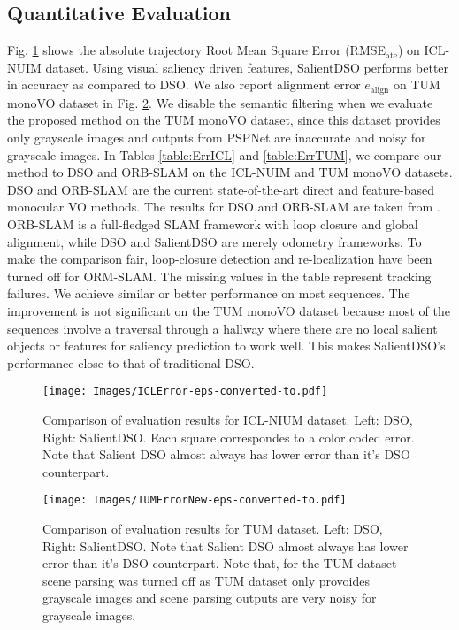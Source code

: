 \documentclass[letterpaper, 10 pt, conference]{ieeeconf}  %
\begin{document}
\subsection{Quantitative Evaluation}
Fig. \ref{fig:ICL_err} shows the absolute trajectory Root Mean Square Error (RMSE$_{\text{ate}}$) on ICL-NUIM dataset. Using visual saliency driven features, SalientDSO performs better in accuracy as compared to DSO. We also report alignment error $e_{\text{align}}$ on TUM monoVO dataset in Fig. \ref{fig:TUM_err}. We disable the semantic filtering when we evaluate the proposed method on the TUM monoVO dataset, since this dataset provides only grayscale images and outputs from PSPNet are inaccurate and noisy for grayscale images. In Tables \ref{table:ErrICL} and \ref{table:ErrTUM}, we compare our method to DSO and ORB-SLAM on the ICL-NUIM and TUM monoVO datasets. DSO and ORB-SLAM are the current state-of-the-art direct and feature-based monocular VO methods. The results for DSO and ORB-SLAM are taken from \cite{DSO}. ORB-SLAM is a full-fledged SLAM framework with loop closure and global alignment, while DSO and SalientDSO are merely odometry frameworks. To make the comparison fair, loop-closure detection and re-localization have been turned off for ORM-SLAM. The missing values in the table represent tracking failures. We achieve similar or better performance on most sequences. The improvement is not significant on the TUM monoVO dataset because most of the sequences involve a traversal through a hallway where there are no local salient objects or features for saliency prediction to work well. This makes SalientDSO's performance close to that of traditional DSO.  

\begin{figure}[t!]
    \centering
    \texttt{[image: Images/ICLError-eps-converted-to.pdf]}
    \caption{Comparison of evaluation results for ICL-NIUM dataset. Left: DSO, Right: SalientDSO. Each square correspondes to a color coded error. Note that Salient DSO almost always has lower error than it's DSO counterpart.}
    \label{fig:ICL_err}
\end{figure}

\begin{figure}[t!]
    \centering
    \texttt{[image: Images/TUMErrorNew-eps-converted-to.pdf]}
    \caption{Comparison of evaluation results for TUM dataset. Left: DSO, Right: SalientDSO. Note that Salient DSO almost always has lower error than it's DSO counterpart. Note that, for the TUM dataset scene parsing was turned off as TUM dataset only provoides grayscale images and scene parsing outputs are very noisy for grayscale images.}
    \label{fig:TUM_err}
\end{figure}
\end{document}
